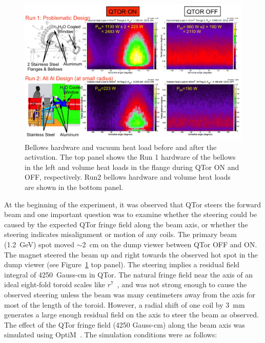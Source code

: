 \begin{singlespace}
\begin{figure}[!h]
	\begin{center}
		\includegraphics[width=15.0cm]{figures/vacuumLeakProblem}
	\end{center}
	\caption
		{Bellows hardware and vacuum heat load before and after the activation. The top panel shows the Run 1 hardware of the bellows in the left and volume heat loads in the flange during QTor ON and OFF, respectively. Run2 bellows hardware and volume heat loads are shown in the bottom panel.}
		\label{fig:vacuumLeakProblem}
\end{figure}
\end{singlespace}

At the beginning of the experiment, it was observed that QTor steers the forward beam and one important question was to examine whether the steering could be caused by the expected QTor fringe field along the beam axis, or whether the steering indicates misalignment or motion of any coils. The primary beam (1.2~GeV) spot moved $\sim$2~cm on the dump viewer between QTor OFF and ON. The magnet steered the beam up and right towards the observed hot spot in the dump viewer (see Figure~\ref{fig:vacuumLeakProblem} top panel). The steering implies a residual field integral of 4250~Gauss-cm in QTor. The natural fringe field near the axis of an ideal eight-fold toroid scales like $r^{7}$~\cite{elog:rob_qtor2}, and was not strong enough to cause the observed steering unless the beam was many centimeters away from the axis for most of the length of the toroid. However, a radial shift of one coil by 3~mm generates a large enough residual field on the axis to steer the beam as observed. 
The effect of the QTor fringe field (4250 Gauss-cm) along the beam axis was simulated using OptiM~\cite{elog:nur_qtor3}. The simulation conditions were as follows: 

